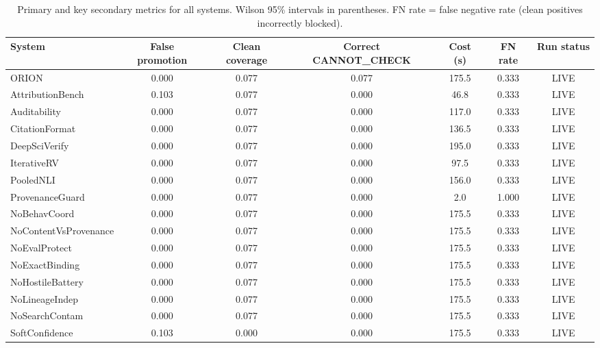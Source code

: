 \begin{table}[t]
\centering
\caption{Primary and key secondary metrics for all systems. Wilson 95\% intervals in parentheses. FN rate = false negative rate (clean positives incorrectly blocked).}
\label{tab:p4_t2}
\begin{tabular}{lcccccc}
\toprule
System & False promotion & Clean coverage & Correct CANNOT_CHECK & Cost (s) & FN rate & Run status \\
\midrule
ORION & 0.000 & 0.077 & 0.077 & 175.5 & 0.333 & LIVE \\
AttributionBench & 0.103 & 0.077 & 0.000 & 46.8 & 0.333 & LIVE \\
Auditability & 0.000 & 0.077 & 0.000 & 117.0 & 0.333 & LIVE \\
CitationFormat & 0.000 & 0.077 & 0.000 & 136.5 & 0.333 & LIVE \\
DeepSciVerify & 0.000 & 0.077 & 0.000 & 195.0 & 0.333 & LIVE \\
IterativeRV & 0.000 & 0.077 & 0.000 & 97.5 & 0.333 & LIVE \\
PooledNLI & 0.000 & 0.077 & 0.000 & 156.0 & 0.333 & LIVE \\
ProvenanceGuard & 0.000 & 0.077 & 0.000 & 2.0 & 1.000 & LIVE \\
NoBehavCoord & 0.000 & 0.077 & 0.000 & 175.5 & 0.333 & LIVE \\
NoContentVsProvenance & 0.000 & 0.077 & 0.000 & 175.5 & 0.333 & LIVE \\
NoEvalProtect & 0.000 & 0.077 & 0.000 & 175.5 & 0.333 & LIVE \\
NoExactBinding & 0.000 & 0.077 & 0.000 & 175.5 & 0.333 & LIVE \\
NoHostileBattery & 0.000 & 0.077 & 0.000 & 175.5 & 0.333 & LIVE \\
NoLineageIndep & 0.000 & 0.077 & 0.000 & 175.5 & 0.333 & LIVE \\
NoSearchContam & 0.000 & 0.077 & 0.000 & 175.5 & 0.333 & LIVE \\
SoftConfidence & 0.103 & 0.000 & 0.000 & 175.5 & 0.333 & LIVE \\
\bottomrule
\end{tabular}
\end{table}
